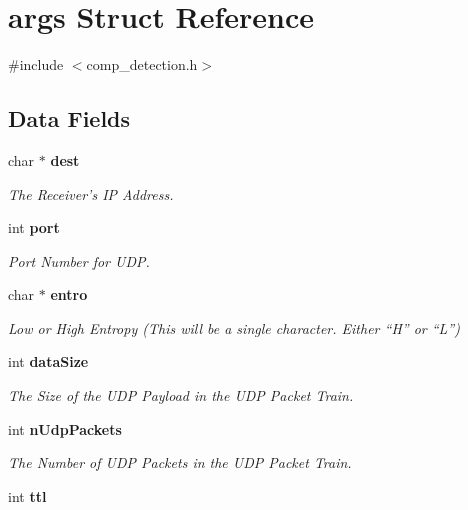 \section{args Struct Reference}
\label{structargs}


{\ttfamily \#include $<$comp\-\_\-detection.\-h$>$}

\subsection*{Data Fields}
\begin{DoxyCompactItemize}
\item 
char $\ast$ {\bf dest}\label{structargs_a21b0374bf8175befbde3cf5ad4831c04}

\begin{DoxyCompactList}\small\item\em The Receiver’s I\-P Address. \end{DoxyCompactList}\item 
int {\bf port}\label{structargs_a63c89c04d1feae07ca35558055155ffb}

\begin{DoxyCompactList}\small\item\em Port Number for U\-D\-P. \end{DoxyCompactList}\item 
char $\ast$ {\bf entro}\label{structargs_afbefbf763d341b44ca3922e04288da2a}

\begin{DoxyCompactList}\small\item\em Low or High Entropy (This will be a single character. Either “\-H” or “\-L”) \end{DoxyCompactList}\item 
int {\bf data\-Size}\label{structargs_a8c8e474bb8d2c6f7162455416b488e50}

\begin{DoxyCompactList}\small\item\em The Size of the U\-D\-P Payload in the U\-D\-P Packet Train. \end{DoxyCompactList}\item 
int {\bf n\-Udp\-Packets}\label{structargs_ae55a3ecedb45db1e4b994bcb96987394}

\begin{DoxyCompactList}\small\item\em The Number of U\-D\-P Packets in the U\-D\-P Packet Train. \end{DoxyCompactList}\item 
int {\bf ttl}\label{structargs_a869bf8a50756e5adbdb1cf05a99c0a45}


\end{DoxyCompactItemize}
